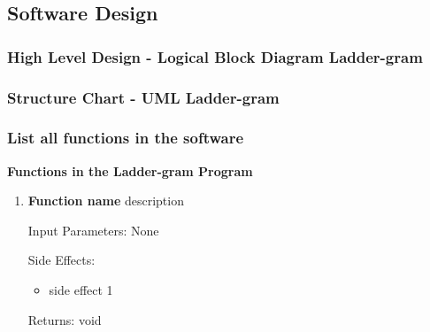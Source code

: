 \documentclass[12pt, a4]{report}
\begin{document}
\subsection{Software Design}
	\subsubsection{High Level Design - Logical Block Diagram \textbar{} Ladder-gram}

	\pagebreak

	\subsubsection{Structure Chart - UML \textbar{} Ladder-gram}
	\paragraph{}

	\subsubsection{List all functions in the software}
	\textbf{	Functions in the Ladder-gram Program}
	\begin{enumerate}
		\item
			\textbf{Function name}
			\textbar{}  description
			\par Input Parameters: None
			\par Side Effects:
			\begin{itemize}
				\item side effect 1
			\end{itemize}
			\par Returns: void
	\end{enumerate}
	
\end{document}
